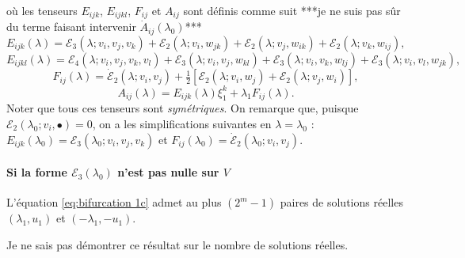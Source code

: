 \documentclass{article}
\newcommand{\nocomma}{}
\newcommand{\tmem}[1]{{\em #1\/}}
\begin{document}
o{\`u} les tenseurs $E_{i \nocomma j \nocomma k}$, $E_{i \nocomma j \nocomma k
\nocomma l}$, $F_{i \nocomma j}$ et $A_{i \nocomma j}$ sont d{\'e}finis comme
suit ***je ne suis pas s{\^u}r du terme faisant intervenir $\dot{A}_{i
\nocomma j} (\lambda_0)$***
\begin{equation}
  \label{eq:def Eijk} E_{i \nocomma j \nocomma k} (\lambda) =\mathcal{E}_3
  (\lambda ; v_i, v_j, v_k) +\mathcal{E}_2 (\lambda  ; v_i, w_{j \nocomma k})
  +\mathcal{E}_2 (\lambda ; v_j, w_{i \nocomma k}) +\mathcal{E}_2 (\lambda ;
  v_k, w_{i \nocomma j}),
\end{equation}
\begin{equation}
  \label{eq:def Eijkl} E_{i \nocomma j \nocomma k \nocomma l} (\lambda)
  =\mathcal{E}_4 (\lambda  ; v_i, v_j, v_k, v_l) +\mathcal{E}_3 (\lambda ;
  v_i, v_j, w_{k \nocomma l}) +\mathcal{E}_3 (\lambda ; v_i, v_k, w_{l
  \nocomma j}) +\mathcal{E}_3 (\lambda ; v_i, v_l, w_{j \nocomma k}),
\end{equation}
\begin{equation}
  \label{eq:def Fij} F_{i \nocomma j} (\lambda) = \dot{\mathcal{E}}_2 (\lambda
  ; v_i, v_j) + \tfrac{1}{2}  [\mathcal{E}_2 (\lambda  ; v_i, w_j)
  +\mathcal{E}_2 (\lambda  ; v_j, w_i)],
\end{equation}
\begin{equation}
  \label{eq:def Aij} A_{i \nocomma j} (\lambda) = E_{i \nocomma j \nocomma k}
  (\lambda) \xi_1^k + \lambda_1 F_{i \nocomma j} (\lambda) .
\end{equation}
Noter que tous ces tenseurs sont {\tmem{sym{\'e}triques}}. On remarque que,
puisque $\mathcal{E}_2 (\lambda_0 ; v_i, \bullet) = 0$, on a les
simplifications suivantes en $\lambda = \lambda_0$ : $E_{i \nocomma j \nocomma
k} (\lambda_0) =\mathcal{E}_3 (\lambda_0 ; v_i, v_j, v_k)$ et $F_{i \nocomma
j} (\lambda_0) = \dot{\mathcal{E}}_2 (\lambda_0 ; v_i, v_j)$.

\paragraph{Si la forme $\mathcal{E}_3 (\lambda_0)$ n'est pas nulle sur
$V$}L'{\'e}quation \eqref{eq:bifurcation 1c} admet au plus $(2^m - 1)$ paires
de solutions r{\'e}elles $(\lambda_1, u_1)$ et $(- \lambda_1, - u_1)$.

\begin{remark}
  Je ne sais pas d{\'e}montrer ce r{\'e}sultat sur le nombre de solutions
  r{\'e}elles.
\end{remark}
\end{document}
